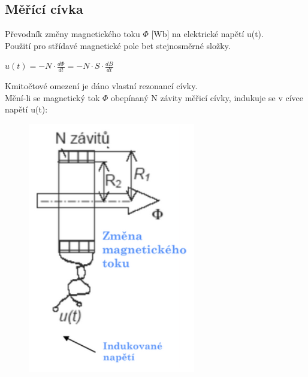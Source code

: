 \subsection{Měřící cívka}
Převodník změny magnetického toku \(\Phi \) [Wb] na elektrické napětí u(t).\\
Použití pro střídavé magnetické pole bet stejnosměrné složky.\\
\begin{center}
    \(u(t) = -N\cdot\frac{d\Phi}{dt} = -N\cdot S\cdot \frac{dB}{dt}\)
\end{center}
Kmitočtové omezení je dáno vlastní rezonancí cívky.\\
Mění-li se magnetický tok \(\Phi\) obepínaný N závity měřicí cívky, indukuje se v cívce napětí u(t):
\begin{figure}[h!]
    \centering
    \includegraphics[scale = 0.4]{images/MerCivka.png}
\end{figure}

